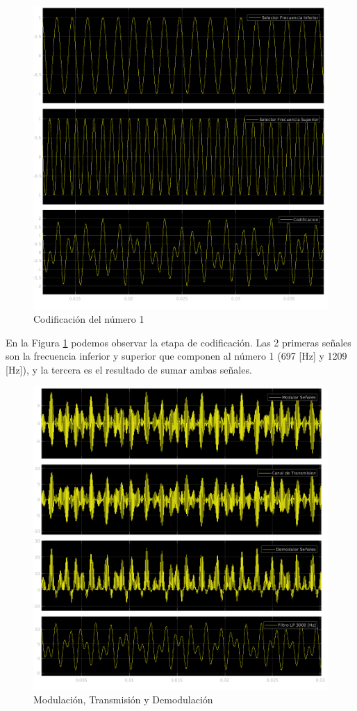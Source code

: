 \begin{figure}[!htb]
  \centering
  \includegraphics[width=\linewidth]{images/simulacion/extendido/cod.png}
  \caption{Codificación del número 1}
  \label{fig:sim_cod}
\end{figure}

En la Figura \ref{fig:sim_cod} podemos observar la etapa de codificación. Las 2 primeras señales son la frecuencia inferior y superior que componen al número 1 (697 [Hz] y 1209 [Hz]), y la tercera es el resultado de sumar ambas señales.

\begin{figure}[!htb]
  \centering
  \includegraphics[width=\linewidth]{images/simulacion/extendido/modem.png}
  \caption{Modulación, Transmisión y Demodulación}
  \label{fig:sim_modem}
\end{figure}

